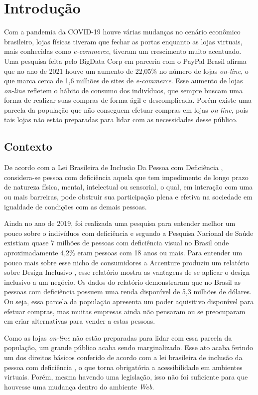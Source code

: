 \newpage
\section{Introdução}
\label{sec:introducao}
 
{Com a pandemia da COVID-19 houve várias mudanças no cenário econômico brasileiro, lojas físicas tiveram que fechar as portas enquanto as lojas virtuais, mais conhecidas como \textit{\textit{e-commerce}}, tiveram um crescimento muito acentuado. Uma pesquisa feita pelo BigData Corp em parceria com o PayPal Brasil \cite{ECOMMERCE} afirma que no ano de 2021 houve um aumento de 22,05\% no número de lojas \textit{on-line}, o que marca cerca de 1,6 milhões de sites de \textit{e-commerce}. Esse aumento de lojas \textit{on-line} refletem o hábito de consumo dos indivíduos, que sempre buscam uma forma de realizar suas compras de forma ágil e descomplicada. Porém existe uma parcela da população que não conseguem efetuar compras em lojas \textit{on-line}, pois tais lojas não estão preparadas para lidar com as necessidades desse público.


}
\subsection{Contexto}
{

De acordo com a  Lei Brasileira de Inclusão Da Pessoa com Deficiência \cite{brasil2015}, 
considera-se pessoa com deficiência aquela que tem impedimento de longo prazo de natureza física, mental, intelectual ou sensorial, o qual, em interação com uma ou mais barreiras, pode obstruir sua participação plena e efetiva na sociedade em igualdade de condições com as demais pessoas.

Ainda no ano de 2019, foi realizada uma pesquisa para entender melhor um pouco sobre o indivíduos com deficiência e segundo a Pesquisa Nacional de Saúde \cite{PNS} existiam quase 7 milhões de pessoas com deficiência visual no Brasil onde aproximadamente 4,2\% eram pessoas com 18 anos ou mais. Para entender um pouco mais sobre esse nicho de consumidores a Accenture produziu um relatório \cite{ACCENTURE} sobre Design Inclusivo \cite{INCLUSIVE-DESIGN}, esse relatório mostra as vantagens de se aplicar o design inclusivo a um negócio. Os dados do relatório demonstraram que no Brasil as pessoas com deficiência possuem uma renda disponível de 5,3 milhões de dólares. Ou seja, essa parcela da população apresenta um poder aquisitivo disponível para efetuar compras, mas muitas empresas ainda não pensaram ou se preocuparam em criar alternativas para vender a estas pessoas. 

Como as lojas \textit{on-line} não estão preparadas para lidar com essa parcela da população, um grande público acaba sendo marginalizado. Esse ato acaba ferindo um dos direitos básicos conferido de acordo com a lei brasileira de inclusão da pessoa com deficiência \cite{brasil2015}, o que torna obrigatória a acessibilidade em ambientes virtuais. Porém, mesma havendo uma legislação, isso não foi suficiente para que houvesse uma mudança dentro do ambiente \textit{Web}. 
}
